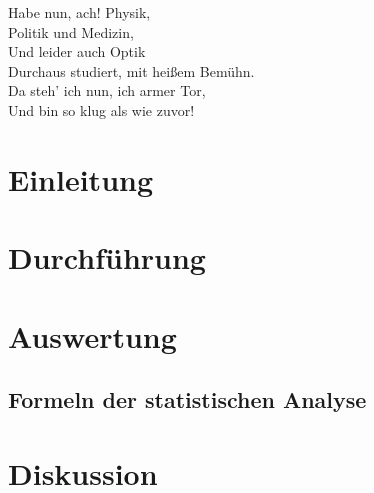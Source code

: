 \documentclass[final,english,ngerman]{PAPclass}
\begin{document}
    
    \clearpage
    \pagestyle{scrheadings}

    \tableofcontents
    \clearpage
    \listoffigures
    \listoftables
    \begin{center}
    Habe nun, ach! Physik,\\
    Politik und Medizin,\\
    Und leider auch Optik\\
    Durchaus studiert, mit heißem Bemühn.\\
    Da steh' ich nun, ich armer Tor,\\
    Und bin so klug als wie zuvor!\autocite{faust}
    \end{center}
    \clearpage                    
    \section{Einleitung}                                %
    
    \clearpage
    \section{Durchführung}
    
    \clearpage
    \section{Auswertung}\label{sec:Auswertung}
    \subsection*{Formeln der statistischen Analyse\autocite{Skript_2.2}}
    
    
    \newpage
    \section{Diskussion}
    
    \clearpage
    \begingroup
    \hypersetup{urlcolor=.,citecolor=citerullink}       %
    \printbibliography[heading=bibintoc,title={Literaturquellen},filter={literature}]
    \printbibliography[heading=bibintoc,title={Abbildungsquellen},filter={figures}]
    \endgroup
    \hypersetup{urlcolor=blueurllink}                   %
    \vfill
    \appendix
    
\end{document}
